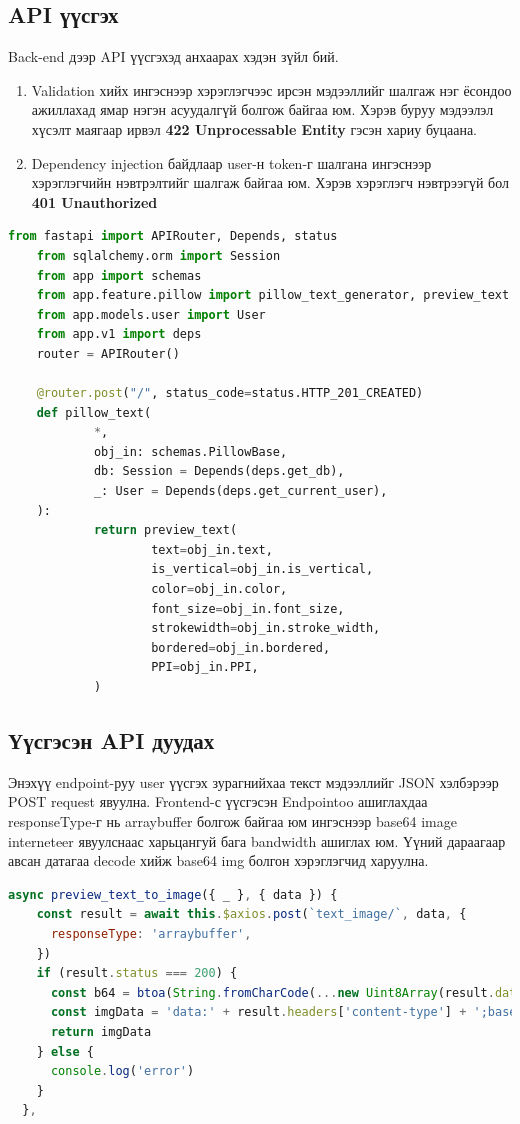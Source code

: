 \subsection{API үүсгэх}
Back-end дээр API үүсгэхэд анхаарах хэдэн зүйл бий.
\begin{enumerate}
	\item Validation хийх ингэснээр хэрэглэгчээс ирсэн мэдээллийг шалгаж нэг ёсондоо ажиллахад  ямар нэгэн асуудалгүй болгож байгаа юм. Хэрэв буруу мэдээлэл хүсэлт маягаар ирвэл \textbf{
		      422 Unprocessable Entity}
	      гэсэн хариу буцаана.

	\item Dependency injection байдлаар user-н token-г шалгана ингэснээр хэрэглэгчийн нэвтрэлтийг шалгаж байгаа юм. Хэрэв хэрэглэгч нэвтрээгүй бол \textbf{
		      401 Unauthorized}


\end{enumerate}
\begin{lstlisting}[language=Python,caption={Зураг буцаан user-лүү илгээх endpoint},frame=single]
	from fastapi import APIRouter, Depends, status
	from sqlalchemy.orm import Session
	from app import schemas
	from app.feature.pillow import pillow_text_generator, preview_text
	from app.models.user import User
	from app.v1 import deps
	router = APIRouter()
	
	@router.post("/", status_code=status.HTTP_201_CREATED)
	def pillow_text(
			*,
			obj_in: schemas.PillowBase,
			db: Session = Depends(deps.get_db),
			_: User = Depends(deps.get_current_user),
	):
			return preview_text(
					text=obj_in.text,
					is_vertical=obj_in.is_vertical,
					color=obj_in.color,
					font_size=obj_in.font_size,
					strokewidth=obj_in.stroke_width,
					bordered=obj_in.bordered,
					PPI=obj_in.PPI,
			)
	\end{lstlisting}

\subsection{Үүсгэсэн API дуудах}
Энэхүү endpoint-руу user үүсгэх зурагнийхаа текст мэдээллийг JSON хэлбэрээр POST request явуулна. Frontend-с үүсгэсэн Endpointoo ашиглахдаа responseType-г нь arraybuffer болгож байгаа юм ингэснээр base64 image interneteer явуулснаас харьцангуй бага bandwidth ашиглах юм. Үүний дараагаар авсан датагаа decode хийж base64 img болгон хэрэглэгчид харуулна.


\begin{lstlisting}[language=JavaScript,caption={Endpoint дуудах function},frame=single]
	async preview_text_to_image({ _ }, { data }) {
    const result = await this.$axios.post(`text_image/`, data, {
      responseType: 'arraybuffer',
    })
    if (result.status === 200) {
      const b64 = btoa(String.fromCharCode(...new Uint8Array(result.data)))
      const imgData = 'data:' + result.headers['content-type'] + ';base64,' + b64
      return imgData
    } else {
      console.log('error')
    }
  },
\end{lstlisting}

